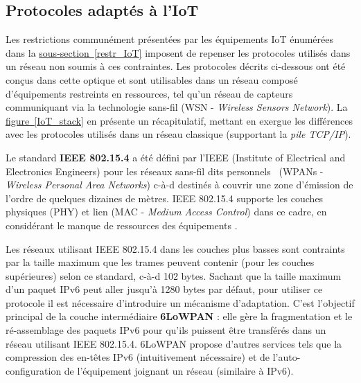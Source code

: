 \documentclass[]{article}
\newcommand{\wordlink}[2]{\hyperref[#1]{#2~\ref{#1}}}
\begin{document}

\subsection{Protocoles adaptés à l'IoT}\label{IoT_prot}

\par Les restrictions communément présentées par les équipements IoT énumérées dans la \wordlink{restr_IoT}{sous-section} imposent de repenser les protocoles utilisés dans un réseau non soumis à ces contraintes. Les protocoles décrits ci-dessous ont été conçus dans cette optique et sont utilisables dans un réseau composé d'équipements restreints en ressources, tel qu'un réseau de capteurs communiquant via la technologie sans-fil (WSN - \textit{Wireless Sensors Network}). La \wordlink{IoT_stack}{figure} en présente un récapitulatif, mettant en exergue les différences avec les protocoles utilisés dans un réseau classique (supportant la \textit{pile TCP/IP}).\\

\par Le standard \textbf{IEEE 802.15.4} a été défini par l'IEEE (Institute of Electrical and Electronics Engineers) pour les réseaux sans-fil dits \og personnels \fg \ (WPANs - \textit{Wireless Personal Area Networks}) c-à-d destinés à couvrir une zone d'émission de l'ordre de quelques dizaines de mètres. IEEE 802.15.4 supporte les couches physiques (PHY) et lien (MAC - \textit{Medium Access Control}) dans ce cadre, en considérant le manque de ressources des équipements \cite{Granjal2015} \cite{Huichen2016}.\\

\par Les réseaux utilisant IEEE 802.15.4 dans les couches plus basses sont contraints par la taille maximum que les trames peuvent contenir (pour les couches supérieures) selon ce standard, c-à-d 102 bytes. Sachant que la taille maximum d'un paquet IPv6 peut aller jusqu'à 1280 bytes par défaut, pour utiliser ce protocole il est nécessaire d'introduire un mécanisme d'adaptation. C'est l'objectif principal de la couche intermédiaire \textbf{6LoWPAN} : elle gère la fragmentation et le ré-assemblage des paquets IPv6 pour qu'ils puissent être transférés dans un réseau utilisant IEEE 802.15.4. 6LoWPAN propose d'autres services tels que la compression des en-têtes IPv6 (intuitivement nécessaire) et de l'auto-configuration de l'équipement joignant un réseau (similaire à IPv6).\\
\end{document}
